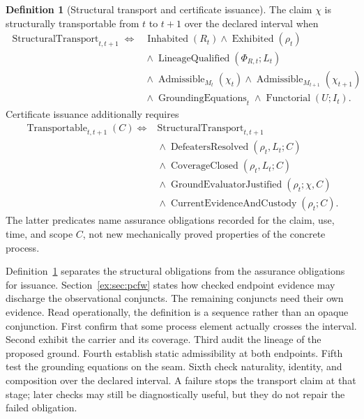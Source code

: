 \documentclass[11pt]{article}
\theoremstyle{definition}
\newtheorem{definition}{Definition}[section]
\begin{document}
\begin{definition}[Structural transport and certificate issuance]\label{ex:def:nonvacuous-transport}
The claim $\chi$ is structurally transportable from $t$ to $t+1$ over the declared interval when
\[
\begin{aligned}
\operatorname{StructuralTransport}_{t,t+1} \Longleftrightarrow{}&
\operatorname{Inhabited}(R_t) \land \operatorname{Exhibited}(\rho_t) \\
&{}\land \operatorname{LineageQualified}(\Phi_{R,t};L_t) \\
&{}\land \operatorname{Admissible}_{M_t}(\chi_t) \land \operatorname{Admissible}_{M_{t+1}}(\chi_{t+1}) \\
&{}\land \operatorname{GroundingEquations}_t \land \operatorname{Functorial}(U;I_t).
\end{aligned}
\]
Certificate issuance additionally requires
\[
\begin{aligned}
\operatorname{Transportable}_{t,t+1}(C)\Longleftrightarrow{}&
\operatorname{StructuralTransport}_{t,t+1}\\
&{}\land\operatorname{DefeatersResolved}(\rho_t,L_t;C)\\
&{}\land\operatorname{CoverageClosed}(\rho_t,L_t;C)\\
&{}\land\operatorname{GroundEvaluatorJustified}(\rho_t;\chi,C)\\
&{}\land\operatorname{CurrentEvidenceAndCustody}(\rho_t;C).
\end{aligned}
\]
The latter predicates name assurance obligations recorded for the claim, use, time, and scope $C$, not new mechanically proved properties of the concrete process.
\end{definition}

Definition~\ref{ex:def:nonvacuous-transport} separates the structural obligations from the assurance obligations for issuance. Section~\ref{ex:sec:pcfw} states how checked endpoint evidence may discharge the observational conjuncts. The remaining conjuncts need their own evidence. Read operationally, the definition is a sequence rather than an opaque conjunction. First confirm that some process element actually crosses the interval. Second exhibit the carrier and its coverage. Third audit the lineage of the proposed ground. Fourth establish static admissibility at both endpoints. Fifth test the grounding equations on the seam. Sixth check naturality, identity, and composition over the declared interval. A failure stops the transport claim at that stage; later checks may still be diagnostically useful, but they do not repair the failed obligation.
\end{document}
